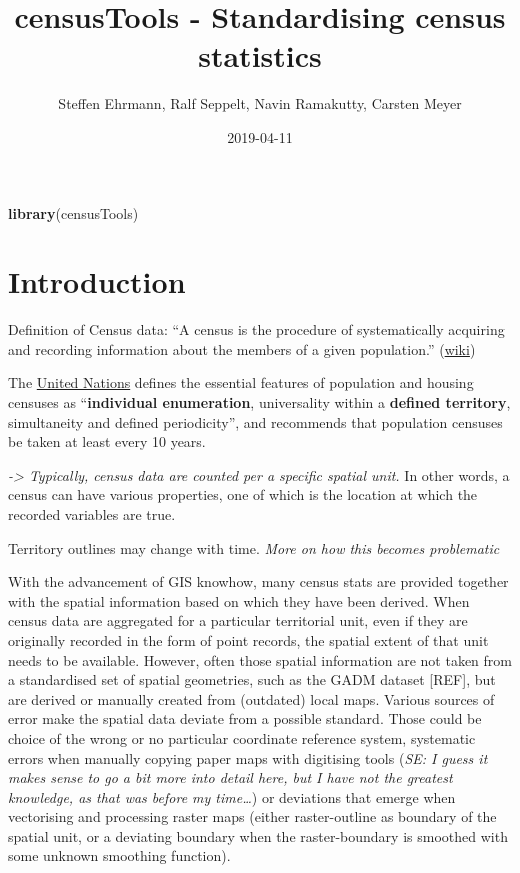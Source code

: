 \documentclass[12pt,]{article}
\title{censusTools - Standardising census statistics}
\author{Steffen Ehrmann, Ralf Seppelt, Navin Ramakutty, Carsten Meyer}
\date{2019-04-11}
\newenvironment{Shaded}{}{}
\newcommand{\KeywordTok}[1]{\textcolor[rgb]{0.00,0.44,0.13}{\textbf{#1}}}
\newcommand{\NormalTok}[1]{#1}
\begin{document}
\maketitle

\begin{Shaded}
\begin{Highlighting}[]
\KeywordTok{library}\NormalTok{(censusTools)}
\end{Highlighting}
\end{Shaded}

\hypertarget{introduction}{%
\section{Introduction}\label{introduction}}

Definition of Census data: ``A census is the procedure of systematically acquiring and recording information about the members of a given population.'' (\href{https://en.wikipedia.org/wiki/Census}{wiki})

The \href{https://unstats.un.org/unsd/demographic/sources/census/docs/P\&R_Rev2.pdf}{United Nations} defines the essential features of population and housing censuses as ``\textbf{individual enumeration}, universality within a \textbf{defined territory}, simultaneity and defined periodicity'', and recommends that population censuses be taken at least every 10 years.

\emph{-\textgreater{} Typically, census data are counted per a specific spatial unit.} In other words, a census can have various properties, one of which is the location at which the recorded variables are true.

Territory outlines may change with time. \emph{More on how this becomes problematic}

With the advancement of GIS knowhow, many census stats are provided together with the spatial information based on which they have been derived.
When census data are aggregated for a particular territorial unit, even if they are originally recorded in the form of point records, the spatial extent of that unit needs to be available.
However, often those spatial information are not taken from a standardised set of spatial geometries, such as the GADM dataset {[}REF{]}, but are derived or manually created from (outdated) local maps.
Various sources of error make the spatial data deviate from a possible standard.
Those could be choice of the wrong or no particular coordinate reference system, systematic errors when manually copying paper maps with digitising tools (\emph{SE: I guess it makes sense to go a bit more into detail here, but I have not the greatest knowledge, as that was before my time\ldots{}}) or deviations that emerge when vectorising and processing raster maps (either raster-outline as boundary of the spatial unit, or a deviating boundary when the raster-boundary is smoothed with some unknown smoothing function).
\end{document}
